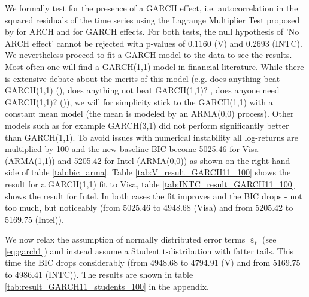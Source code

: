 We formally test for the presence of a GARCH effect, i.e. autocorrelation in the squared residuals of the time series using the Lagrange Multiplier Test proposed by \citet{engle_autoregressive_1982} for ARCH and \citet{lee_lagrange_1991} for GARCH effects. For both tests, the null hypothesis of 'No ARCH effect' cannot be rejected with p-values of 0.1160 (V) and 0.2693 (INTC). We nevertheless proceed to fit a GARCH model to the data to see the results. Most often one will find a GARCH(1,1) model in financial literature. While there is extensive debate about the merits of this model (e.g. does anything beat GARCH(1,1) (\cite{hansen_forecast_2005}), does anything not beat GARCH(1,1)? \citep{alexios_does_2013}, does anyone need GARCH(1,1)? (\citep{reschenhofer_does_2013})), we will for simplicity stick to the GARCH(1,1) with a constant mean model (the mean is modeled by an ARMA(0,0) process). Other models such as for example GARCH(3,1) did not perform significantly better than GARCH(1,1). To avoid issues with numerical instability all log-returns are multiplied by 100 and the new baseline BIC become 5025.46 for Visa (ARMA(1,1)) and 5205.42 for Intel (ARMA(0,0)) as shown on the right hand side of table \ref{tab:bic_arma}. Table \ref{tab:V_result_GARCH11_100} shows the result for a GARCH(1,1) fit to Visa, table \ref{tab:INTC_result_GARCH11_100} shows the result for Intel. In both cases the fit improves and the BIC drops - not too much, but noticeably (from 5025.46 to 4948.68 (Visa) and from 5205.42 to 5169.75 (Intel)). 

\begin{table}[h!]
    \centering
    \vspace{-2ex}
    \small
    
    \caption{}
    \label{tab:V_result_GARCH11_100}
\end{table}{}

\begin{table}[h!]
    \centering
    
    \caption{}
    \label{tab:INTC_result_GARCH11_100}
\end{table}{}

We now relax the assumption of normally distributed error terms $\upepsilon_t$ (see \ref{eq:garch1}) and instead assume a Student t-distribution with fatter tails. This time the BIC drops considerably (from 4948.68 to 4794.91 (V) and from 5169.75 to 4986.41 (INTC)). The results are shown in table \ref{tab:result_GARCH11_students_100} in the appendix. 

